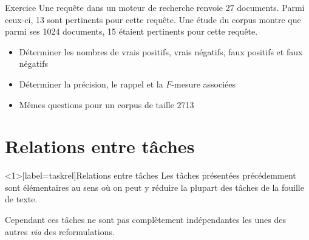 \documentclass[../allslides.tex]{subfiles}
\begin{document}
\begin{frame}{Exercice}
	Une requête dans un moteur de recherche renvoie \num{27} documents. Parmi ceux-ci, \num{13} sont pertinents pour cette requête. Une étude du corpus montre que parmi ses \num{1024} documents, \num{15} étaient pertinents pour cette requête.
	\begin{itemize}
		\item Déterminer les nombres de vrais positifs, vrais négatifs, faux positifs et faux négatifs
		\item Déterminer la précision, le rappel et la $F$-mesure associées
		\item Mêmes questions pour un corpus de taille \num{2713}
	\end{itemize}
\end{frame}



\section{Relations entre tâches}
\begin{frame}<1>[label=taskrel]{Relations entre tâches}
	Les tâches présentées précédemment sont \alert{élémentaires} au sens où on peut y \alert{réduire} la plupart des tâches de la fouille de texte.

	Cependant ces tâches ne sont pas complètement indépendantes les unes des autres \emph{via} des \alert{reformulations}.
\end{frame}
\end{document}
